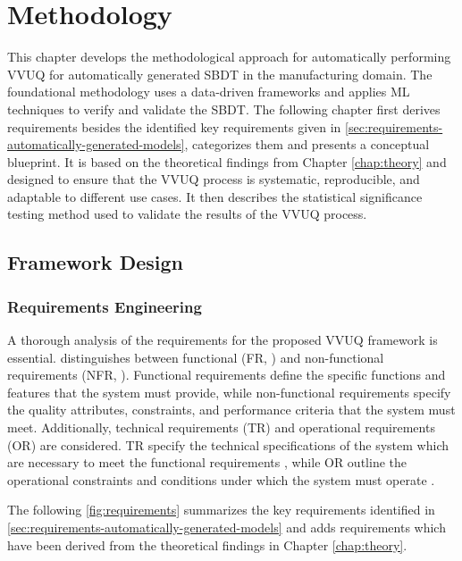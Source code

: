 \chapter{Methodology}
\label{chap:methodology}
This chapter develops the methodological approach for automatically performing VVUQ for automatically generated SBDT in the manufacturing domain. The foundational methodology uses a data-driven frameworks and applies ML techniques to verify and validate the SBDT. The following chapter first derives requirements besides the identified key requirements given in \autoref{sec:requirements-automatically-generated-models}, categorizes them and presents a conceptual blueprint. It is based on the theoretical findings from Chapter \ref{chap:theory} and designed to ensure that the VVUQ process is systematic, reproducible, and adaptable to different use cases. It then describes the statistical significance testing method used to validate the results of the VVUQ process.

\section{Framework Design}
\subsection{Requirements Engineering}
A thorough analysis of the requirements for the proposed VVUQ framework is essential. \Textcite{sindhgatta2005functional} distinguishes between functional (FR, \textcite{van2001goal}) and non-functional requirements (NFR, \textcite{glinz2005rethinking}). Functional requirements define the specific functions and features that the system must provide, while non-functional requirements specify the quality attributes, constraints, and performance criteria that the system must meet. Additionally, technical requirements (TR) and operational requirements (OR) are considered. TR specify the technical specifications of the system which are necessary to meet the functional requirements \autocite{chikh2012new}, while OR outline the operational constraints and conditions under which the system must operate \autocite{incose2023incose}.

The following \autoref{fig:requirements} summarizes the key requirements identified in \autoref{sec:requirements-automatically-generated-models} and adds requirements which have been derived from the theoretical findings in Chapter \ref{chap:theory}.

